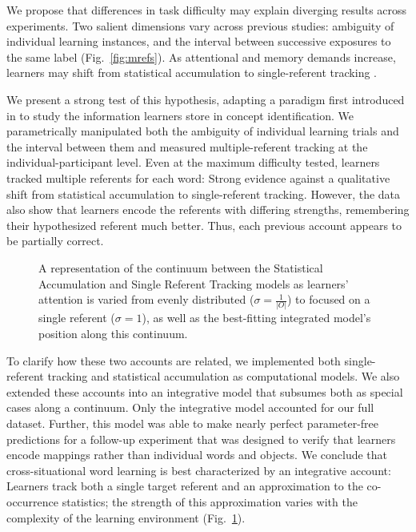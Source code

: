 \documentclass[man,floatsintext]{apa6}
\begin{document}
We propose that differences in task difficulty may explain diverging results across experiments. Two salient dimensions vary across previous studies: ambiguity of individual learning instances, and the interval between successive exposures to the same label (Fig.~\ref{fig:mrefs}). As attentional and memory demands increase, learners may shift from statistical accumulation to single-referent tracking \cite{Smith2011a, Trueswell2013}. 

We present a strong test of this hypothesis, adapting a paradigm first introduced in \cite{Bower1963} to study the information learners store in concept identification. We parametrically manipulated both the ambiguity of individual learning trials and the interval between them and measured multiple-referent tracking at the individual-participant level. Even at the maximum difficulty tested, learners tracked multiple referents for each word: Strong evidence against a qualitative shift from statistical accumulation to single-referent tracking. However, the data also show that learners encode the referents with differing strengths, remembering their hypothesized referent much better. Thus, each previous account appears to be partially correct. 

 \begin{figure}[t]
	\caption{\label{fig:models} A representation of the continuum between the Statistical Accumulation and Single Referent Tracking models as learners' attention is varied from evenly distributed ($\sigma=\frac{1}{|O|}$) to focused on a single referent ($\sigma=1$), as well as the best-fitting integrated model's position along this continuum.}
\end{figure}

To clarify how these two accounts are related, we implemented both single-referent tracking and statistical accumulation as computational models. We also extended these accounts into an integrative model that subsumes both as special cases along a continuum. Only the integrative model accounted for our full dataset. Further, this model was able to make nearly perfect parameter-free predictions for a follow-up experiment that was designed to verify that learners encode mappings rather than individual words and objects. We conclude that cross-situational word learning is best characterized by an integrative account: Learners track both a single target referent and an approximation to the co-occurrence statistics; the strength of this approximation varies with the complexity of the learning environment (Fig.~\ref{fig:models}).
\end{document}
